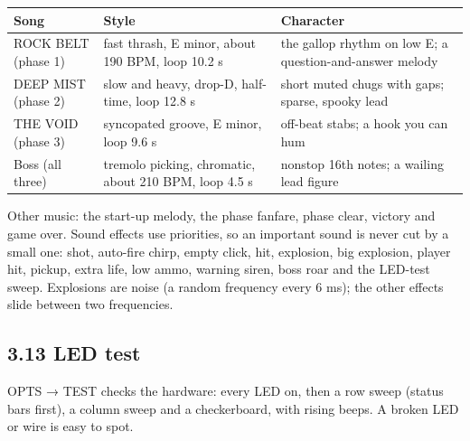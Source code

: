 \documentclass[11pt,a4paper]{article}
\begin{document}
\par\noindent\begin{minipage}{\linewidth}\centering\small
\begin{tabular}{|>{\raggedright\arraybackslash}p{3.82cm}|>{\raggedright\arraybackslash}p{5.74cm}|>{\raggedright\arraybackslash}p{6.69cm}|}
\hline\rowcolor{accent}\textbf{\color{white}Song} & \textbf{\color{white}Style} & \textbf{\color{white}Character}\\\hline
ROCK BELT (phase 1) & fast thrash, E minor, about 190 BPM, loop 10.2 s & the gallop rhythm on low E; a question-and-answer melody\\\hline
\rowcolor{rowshade}DEEP MIST (phase 2) & slow and heavy, drop-D, half-time, loop 12.8 s & short muted chugs with gaps; sparse, spooky lead\\\hline
THE VOID (phase 3) & syncopated groove, E minor, loop 9.6 s & off-beat stabs; a hook you can hum\\\hline
\rowcolor{rowshade}Boss (all three) & tremolo picking, chromatic, about 210 BPM, loop 4.5 s & nonstop 16th notes; a wailing lead figure\\\hline
\end{tabular}
\end{minipage}\par\medskip

Other music: the start-up melody, the phase fanfare, phase clear, victory and game over. Sound effects use priorities, so an important sound is never cut by a small one: shot, auto-fire chirp, empty click, hit, explosion, big explosion, player hit, pickup, extra life, low ammo, warning siren, boss roar and the LED-test sweep. Explosions are noise (a random frequency every 6 ms); the other effects slide between two frequencies.

\subsection*{3.13 LED test}
OPTS → TEST checks the hardware: every LED on, then a row sweep (status bars first), a column sweep and a checkerboard, with rising beeps. A broken LED or wire is easy to spot.
\end{document}

